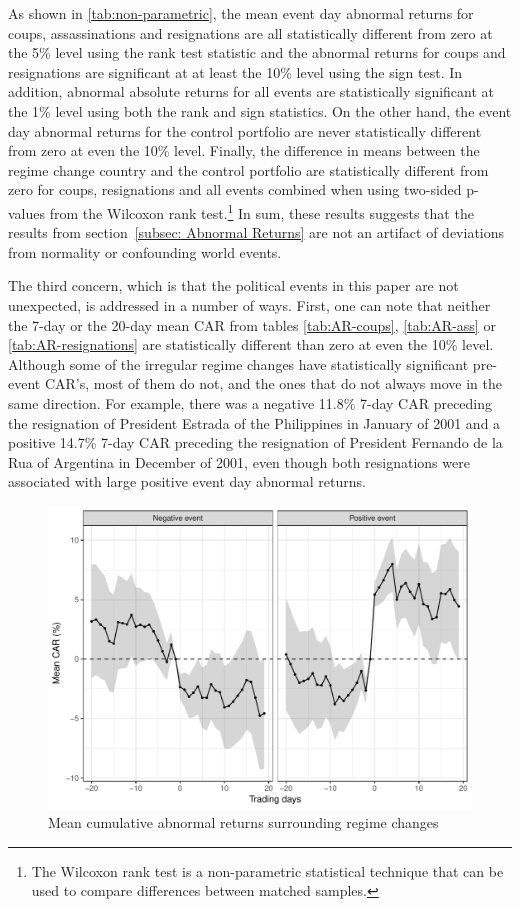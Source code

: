 \documentclass[12pt,final,fleqn]{article}
\theoremstyle{plain}
\begin{document}
As shown in \autoref{tab:non-parametric}, the mean event day abnormal returns for coups, assassinations and resignations are all statistically different from zero at the 5\% level using the rank test statistic and the abnormal returns for coups and resignations are significant at at least the 10\% level using the sign test. In addition, abnormal absolute returns for all events are statistically significant at the 1\% level using both the rank and sign statistics. On the other hand, the event day abnormal returns for the control portfolio are never statistically different from zero at even the 10\% level. Finally, the difference in means between the regime change country and the control portfolio are statistically different from zero for coups, resignations and all events combined when using two-sided p-values from the Wilcoxon rank test.\footnote{The Wilcoxon rank test is a non-parametric statistical technique that can be used to compare differences between matched samples.} In sum, these results suggests that the results from section~\autoref{subsec: Abnormal Returns} are not an artifact of deviations from normality or confounding world events.

The third concern, which is that the political events in this paper are not unexpected, is addressed in a number of ways. First, one can note that neither the 7-day or the 20-day mean CAR from tables \autoref{tab:AR-coups}, \autoref{tab:AR-ass} or \autoref{tab:AR-resignations} are statistically different than zero at even the 10\% level. Although some of the irregular regime changes have statistically significant pre-event CAR's, most of them do not, and the ones that do not always move in the same direction. For example, there was a negative 11.8\% 7-day CAR preceding the resignation of President Estrada of the Philippines in January of 2001 and a positive 14.7\% 7-day CAR preceding the resignation of President Fernando de la Rua of Argentina in December of 2001, even though both resignations were associated with large positive event day abnormal returns.

\begin{figure}[!ht]
\includegraphics{../figs/mean-car-pos-neg.pdf}
\caption{Mean cumulative abnormal returns surrounding regime changes}
\label{fig:CAR-mean}
\end{figure}
\end{document}
